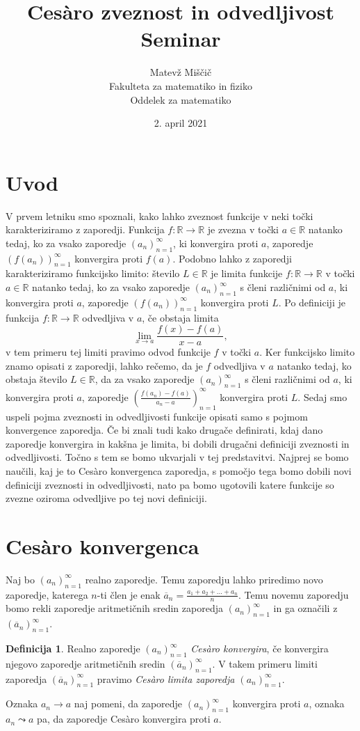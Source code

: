 \documentclass[a4paper,12pt]{article}
\title{Ces\`{a}ro zveznost in odvedljivost \\ Seminar}
\author{Matevž Miščič \\
Fakulteta za matematiko in fiziko \\
Oddelek za matematiko}
\date{2. april 2021}
\theoremstyle{definition}
\newtheorem{definicija}{Definicija}
\theoremstyle{plain}
\begin{document}
\maketitle{}

\section{Uvod}
V prvem letniku smo spoznali, kako lahko zveznost funkcije v neki točki karakteriziramo z zaporedji. Funkcija $f: \mathbb{R} \rightarrow \mathbb{R}$ je zvezna v točki $a \in \mathbb{R}$ natanko tedaj, ko za vsako zaporedje $(a_n)_{n=1}^{\infty}$, ki konvergira proti $a$, zaporedje $(f(a_n))_{n=1}^{\infty}$ konvergira proti $f(a)$. Podobno lahko z zaporedji karakteriziramo funkcijsko limito: število $L \in \mathbb{R}$ je limita funkcije $f: \mathbb{R} \rightarrow \mathbb{R}$ v točki $a \in \mathbb{R}$ natanko tedaj, ko za vsako zaporedje $(a_n)_{n=1}^{\infty}$ s členi različnimi od $a$, ki konvergira proti $a$, zaporedje $(f(a_n))_{n=1}^{\infty}$ konvergira proti $L$. Po definiciji je funkcija $f: \mathbb{R} \rightarrow \mathbb{R}$ odvedljiva v $a$, če obstaja limita $$\lim_{x \rightarrow a} \frac{f(x)-f(a)}{x-a},$$ v tem primeru tej limiti pravimo odvod funkcije $f$ v točki $a$. Ker funkcijsko limito znamo opisati z zaporedji, lahko rečemo, da je $f$ odvedljiva v $a$ natanko tedaj, ko obstaja število $L \in \mathbb{R}$, da za vsako zaporedje $(a_n)_{n=1}^{\infty}$ s členi različnimi od $a$, ki konvergira proti $a$, zaporedje $\left( \frac{f(a_n)-f(a)}{a_n-a} \right)_{n=1}^{\infty}$ konvergira proti $L$. Sedaj smo uspeli pojma zveznosti in odvedljivosti funkcije opisati samo s pojmom konvergence zaporedja. Če bi znali tudi kako drugače definirati, kdaj dano zaporedje konvergira in kakšna je limita, bi dobili drugačni definiciji zveznosti in odvedljivosti. Točno s tem se bomo ukvarjali v tej predstavitvi. Najprej se bomo naučili, kaj je to Ces\`{a}ro konvergenca zaporedja, s pomočjo tega bomo dobili novi definiciji zveznosti in odvedljivosti, nato pa bomo ugotovili katere funkcije so zvezne oziroma odvedljive po tej novi definiciji.



\section{Ces\`{a}ro konvergenca}
Naj bo $(a_n)_{n=1}^{\infty}$ realno zaporedje. Temu zaporedju lahko priredimo novo zaporedje, katerega $n$-ti člen je enak $\overline{a}_n = \frac{a_1+a_2+\ldots+a_n}{n}$. Temu novemu zaporedju bomo rekli zaporedje aritmetičnih sredin zaporedja $(a_n)_{n=1}^{\infty}$ in ga označili z $(\overline{a}_n)_{n=1}^{\infty}$.
\begin{definicija}
    Realno zaporedje $(a_n)_{n=1}^{\infty}$ \emph{Ces\`{a}ro konvergira}, če konvergira njegovo zaporedje aritmetičnih sredin $(\overline{a}_n)_{n=1}^{\infty}$. V takem primeru limiti zaporedja $(\overline{a}_n)_{n=1}^{\infty}$ pravimo \emph{Ces\`{a}ro limita zaporedja $(a_n)_{n=1}^{\infty}$}.
\end{definicija}
Oznaka $a_n \rightarrow a$ naj pomeni, da zaporedje $(a_n)_{n=1}^{\infty}$ konvergira proti $a$, oznaka $a_n \leadsto a$ pa, da zaporedje Ces\`{a}ro konvergira proti $a$. 
\end{document}
